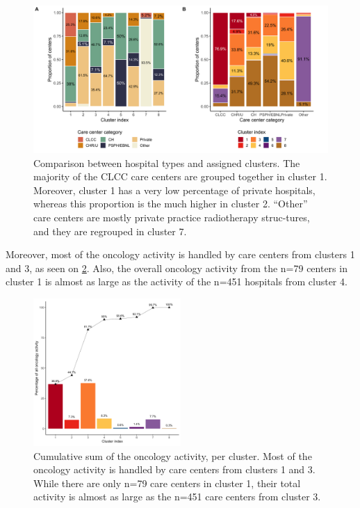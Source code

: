 \begin{figure}[t]
    \includegraphics[width=\textwidth]{images/camion/supplemental/sup_fig2_categories_per_cluster.png}
    \centering
    \caption{
        Comparison between hospital types and assigned clusters. The majority of the CLCC care centers are grouped together in cluster 1. Moreover, cluster 1 has a very low percentage of private hospitals, whereas this proportion is the much higher in cluster 2. “Other” care centers are mostly private practice radiotherapy struc-tures, and they are regrouped in cluster 7.
    }
    \label{fig:clustering-categories}
\end{figure}

Moreover, most of the oncology activity is handled by care centers from clusters 1 and 3, as seen on \cref{fig:clustering-cumulative}. Also, the overall oncology activity from the n=79 centers in cluster 1 is almost as large as the activity of the n=451 hospitals from cluster 4.

\begin{figure}[t]
    \includegraphics[width=0.5\textwidth]{images/camion/supplemental/sup_fig3_nb_stays_per_cluster.png}
    \centering
    \caption{
        Cumulative sum of the oncology activity, per cluster. Most of the oncology activity is handled by care centers from clusters 1 and 3. While there are only n=79 care centers in cluster 1, their total activity is almost as large as the n=451 care centers from cluster 3.
    }
    \label{fig:clustering-cumulative}
\end{figure}

